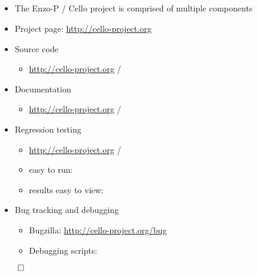 \NEWSEC

\subsection{\ssProjectSummary}


\begin{frame}[fragile,label=ss-project-summary] 
\secframetitle{\ssProjectSummary}
\begin{itemize}
\item The Enzo-P / Cello project is comprised of multiple components
\item Project page: \url{http://cello-project.org}
\item Source code
\begin{itemize}
\item  \url{http://cello-project.org} / 
\end{itemize}
\item Documentation
\begin{itemize}
\item  \url{http://cello-project.org} / 
\end{itemize}
\item Regression testing
\begin{itemize}
\item  \url{http://cello-project.org} / 
\item easy to run: 
\item results easy to view: 
\end{itemize}
\item Bug tracking and debugging
\begin{itemize}
\item Bugzilla: \url{http://cello-project.org/bug}
\item Debugging scripts: 
\end{itemize}
\end{itemize}
\vfill
\centerline{$\qed$}
\end{frame}

